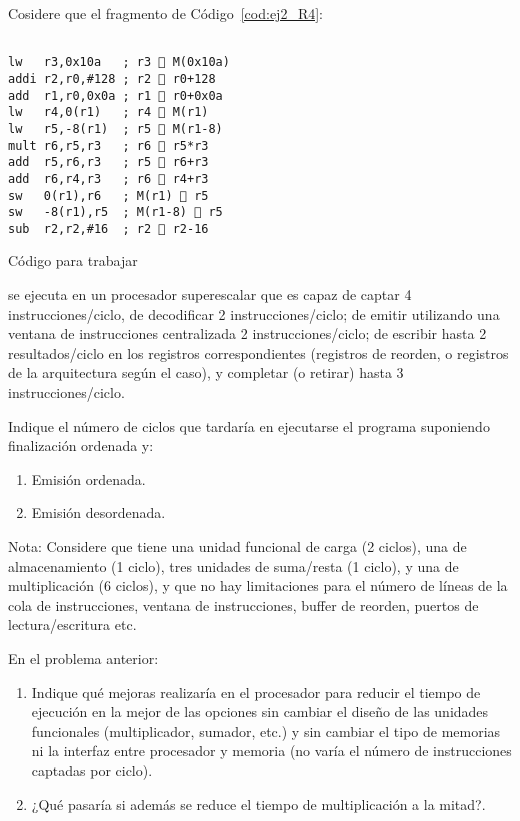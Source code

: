 \begin{ejercicio}
    Cosidere que el fragmento de Código~\ref{cod:ej2_R4}:
    \begin{listing}[H]
    \begin{verbatim}

lw   r3,0x10a   ; r3  M(0x10a)
addi r2,r0,#128 ; r2  r0+128
add  r1,r0,0x0a ; r1  r0+0x0a
lw   r4,0(r1)   ; r4  M(r1)
lw   r5,-8(r1)  ; r5  M(r1-8)
mult r6,r5,r3   ; r6  r5*r3
add  r5,r6,r3   ; r5  r6+r3
add  r6,r4,r3   ; r6  r4+r3
sw   0(r1),r6   ; M(r1)  r5
sw   -8(r1),r5  ; M(r1-8)  r5
sub  r2,r2,#16  ; r2  r2-16
    \end{verbatim}
    \caption{Código para trabajar}
    \label{cod:ej2_R4}
    \end{listing}
se ejecuta en un procesador superescalar que es capaz de captar 4 instrucciones/ciclo, de decodificar 2 instrucciones/ciclo; de emitir utilizando una ventana de instrucciones centralizada 2 instrucciones/ciclo; de escribir hasta 2 resultados/ciclo en los registros correspondientes (registros de reorden, o registros de la arquitectura según el caso), y completar (o retirar) hasta 3 instrucciones/ciclo.

Indique el número de ciclos que tardaría en ejecutarse el programa suponiendo finalización ordenada y:
\begin{enumerate}
    \item Emisión ordenada.
    \item Emisión desordenada.
\end{enumerate}
Nota: Considere que tiene una unidad funcional de carga (2 ciclos), una de almacenamiento (1 ciclo), tres unidades de suma/resta (1 ciclo), y una de multiplicación (6 ciclos), y que no hay limitaciones para el número de líneas de la cola de instrucciones, ventana de instrucciones, buffer de reorden, puertos de lectura/escritura etc.
\end{ejercicio}

\begin{ejercicio}\label{ej:3_R4}
   En el problema anterior: 
   \begin{enumerate}
       \item Indique qué mejoras realizaría en el procesador para reducir el tiempo de ejecución en la mejor de las opciones sin cambiar el diseño de las unidades funcionales (multiplicador, sumador, etc.) y sin cambiar el tipo de memorias ni la interfaz entre procesador y memoria (no varía el número de instrucciones captadas por ciclo).
       \item ¿Qué pasaría si además se reduce el tiempo de multiplicación a la mitad?. 
   \end{enumerate}
\end{ejercicio}

